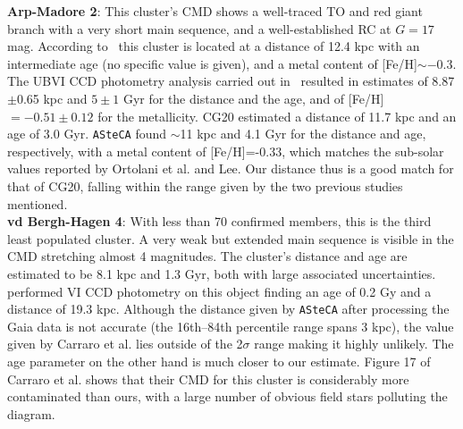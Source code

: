 \documentclass{aa}
\begin{document}
\begin{appendix}
  \noindent \textbf{Arp-Madore 2}: This cluster's CMD shows a well-traced TO and
  red giant branch with a very short main sequence, and a
  well-established RC at $G=17$ mag.
  According to~\cite{Ortolani_1995} this cluster is located at a distance of
  12.4 kpc with an intermediate age (no specific value is given), and a metal
  content of [Fe/H]$\sim-0.3$.
  The UBVI CCD photometry analysis carried out in~\cite{Lee_1997} resulted in
  estimates of 8.87$\pm$0.65 kpc and $5\pm1$ Gyr for the distance and the age,
  and of [Fe/H]$=-0.51\pm0.12$ for the metallicity.
  CG20 estimated a distance of 11.7 kpc and an age of 3.0 Gyr.
  \texttt{ASteCA} found $\sim$11 kpc and 4.1 Gyr for the distance and
  age, respectively, with a metal content of [Fe/H]=-0.33, which matches the
  sub-solar values reported by Ortolani et al. and Lee.
  Our distance thus is a good match for that of CG20, falling within the range
  given by the two previous studies mentioned.\\

  \noindent \textbf{vd Bergh-Hagen 4}: With less than 70 confirmed members, this is the
  third least populated cluster. A very weak but extended main sequence is
  visible in the CMD stretching almost 4 magnitudes.
  The cluster's distance and age are estimated to be 8.1 kpc and 1.3 Gyr,
  both with large associated uncertainties.
  \cite{Carraro_2007} performed VI CCD photometry on this object finding an
  age of 0.2 Gy and a distance of 19.3 kpc. Although the distance given by
  \texttt{ASteCA} after processing the Gaia data is not accurate (the 16th--84th
  percentile range spans 3 kpc), the value given by Carraro et al. lies outside
  of the 2$\sigma$ range making it highly unlikely. The age parameter on the other
  hand is much closer to our estimate.
   Figure 17 of Carraro et al. shows  that their CMD for this
  cluster is considerably more contaminated than ours, with a large number of
  obvious field stars polluting the diagram.\\


\end{appendix}
\end{document}
